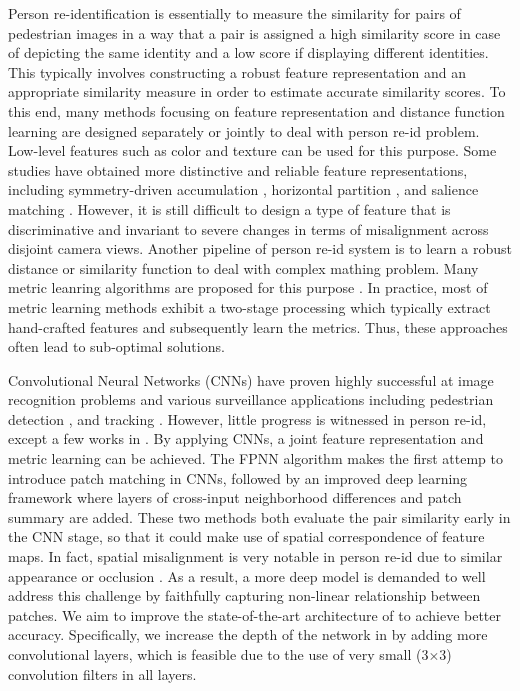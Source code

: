 \documentclass[10pt,journal,twocolumn]{IEEEtran}
\begin{document}
Person re-identification is essentially to measure the similarity for pairs of pedestrian images in a way that a pair is assigned a high similarity score in case of depicting the same identity and a low score if displaying different identities. This typically involves constructing a robust feature representation and an appropriate similarity measure in order to estimate accurate similarity scores. To this end, many methods focusing on feature representation and distance function learning are designed separately or jointly to deal with person re-id problem. Low-level features such as color and texture can be used for this purpose. Some studies have obtained more distinctive and reliable feature representations,
including symmetry-driven accumulation \cite{Farenzena2010Person}, horizontal partition \cite{LOMOMetric,Zheng2013PAMI}, and salience matching \cite{Zhao2013Unsupervised,Zhao2013SalMatch}. However, it is still difficult to design a type of feature that is discriminative and invariant to severe changes in terms of misalignment across disjoint camera views. Another pipeline of person re-id system is to learn a robust distance or similarity function to deal with complex mathing problem. Many metric leanring algorithms are proposed for this purpose \cite{Pedagadi2013Local,Kedem2012Nonlinear,Kostinger2012Large,Xiong2014Person,LADF,PCCA,Zheng2013PAMI,Hirzer2012Person}.
In practice, most of metric learning methods exhibit a two-stage processing which typically extract hand-crafted features and subsequently learn the metrics. Thus, these approaches often lead to sub-optimal solutions.


Convolutional Neural Networks (CNNs) have proven highly successful at image recognition problems and various surveillance applications including pedestrian detection \cite{DeepContextDetection,DeepDetection}, and tracking \cite{DeepTracking}. However, little progress is witnessed in person re-id, except a few works in \cite{JointRe-id,FPNN,DeepReID}.  By applying CNNs, a joint feature representation and metric learning can be achieved. The FPNN algorithm \cite{FPNN} makes the first attemp to introduce patch matching in CNNs, followed by an improved deep learning framework \cite{JointRe-id} where layers of cross-input neighborhood differences
and patch summary are added. These two methods both evaluate the pair similarity early in the CNN stage, so that it could make use of spatial correspondence of feature maps. In fact, spatial misalignment is very notable in person re-id due to similar appearance or occlusion \cite{ReID_structure}. As a result, a more deep model is demanded to well address this challenge by faithfully capturing non-linear relationship between patches. We aim to improve the state-of-the-art architecture of \cite{JointRe-id} to achieve better accuracy. Specifically, we increase the depth of the network in \cite{JointRe-id} by adding more convolutional layers, which is feasible due to the use of very small (3$\times$3) convolution filters in all layers.
\end{document}
